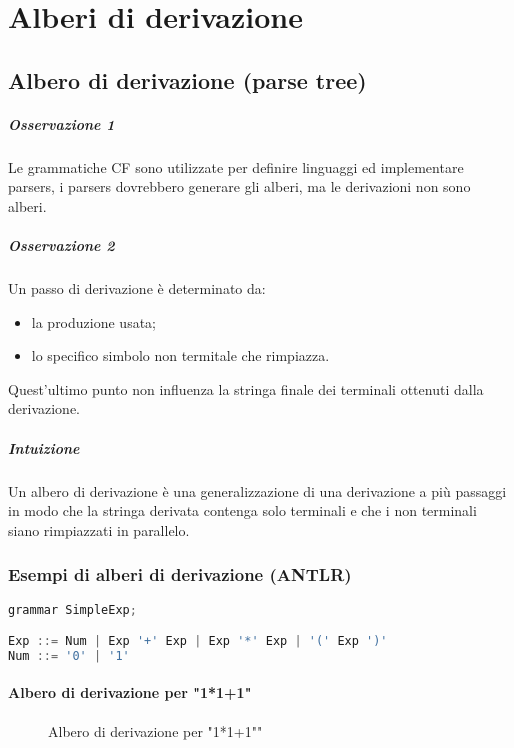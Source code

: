 \chapter{Alberi di derivazione}
\section{Albero di derivazione (parse tree)}
\paragraph{Osservazione 1}
Le grammatiche CF sono utilizzate per definire linguaggi ed implementare
parsers, i parsers dovrebbero generare gli alberi, ma le derivazioni non
sono alberi.

\paragraph{Osservazione 2}
Un passo di derivazione è determinato da:
\begin{itemize}
  \item la produzione usata;
  \item lo specifico simbolo non termitale che rimpiazza.
\end{itemize}
Quest'ultimo punto non influenza la stringa finale dei terminali ottenuti
dalla derivazione.

\paragraph{Intuizione}
Un albero di derivazione è una generalizzazione di una derivazione a più
passaggi in modo che la stringa derivata contenga solo terminali e che i non
terminali siano rimpiazzati in parallelo.

\subsection{Esempi di alberi di derivazione (ANTLR)}
\begin{lstlisting}[language=Java, caption={Grammatica ANTLR}]
grammar SimpleExp;

Exp ::= Num | Exp '+' Exp | Exp '*' Exp | '(' Exp ')'
Num ::= '0' | '1'
\end{lstlisting}

\subsubsection{Albero di derivazione per "1*1+1"}
\begin{figure}[h]
    \centering
    \caption{Albero di derivazione per "1*1+1""}
    \label{fig:dtree-1}
\end{figure}

